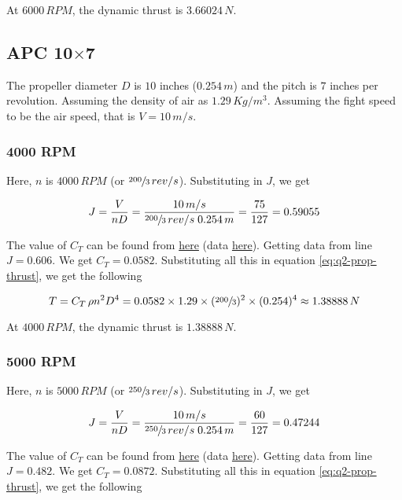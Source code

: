 At $6000\,RPM$, the dynamic thrust is $3.66024\,N$.

\subsection{APC 10\texorpdfstring{$\times$}{by}7}

The propeller diameter $D$ is $10$ inches ($0.254\,m$) and the pitch is $7$ inches per revolution. Assuming the density of air as $1.29\,Kg/m^3$.
Assuming the fight speed to be the air speed, that is $V = 10\,m/s$.

\subsubsection*{4000 RPM}

Here, $n$ is $4000\,RPM$ (or $\sfrac{200}{3}\,rev/s$). Substituting in $J$, we get

\begin{equation*}
    J = \frac{V}{nD} = \frac{10\,m/s}{\sfrac{200}{3}\,rev/s \; 0.254\,m} = \frac{75}{127} = 0.59055
\end{equation*}

The value of $C_T$ can be found from \href{https://m-selig.ae.illinois.edu/props/volume-1/plots/apcsf_10x7_ct.png}{here} (data \href{https://m-selig.ae.illinois.edu/props/volume-1/data/apcsf_10x7_kt0830_3999.txt}{here}). Getting data from line $J = 0.606$. We get $C_T = 0.0582$. Substituting all this in equation \ref{eq:q2-prop-thrust}, we get the following

\begin{equation*}
    T = C_T \, \rho n^2 D^4 = 0.0582 \times 1.29 \times (\sfrac{200}{3})^2 \times (0.254)^4 \approx 1.38888\,N
\end{equation*}

At $4000\,RPM$, the dynamic thrust is $1.38888\,N$.

\subsubsection*{5000 RPM}

Here, $n$ is $5000\,RPM$ (or $\sfrac{250}{3}\,rev/s$). Substituting in $J$, we get

\begin{equation*}
    J = \frac{V}{nD} = \frac{10\,m/s}{\sfrac{250}{3}\,rev/s \; 0.254\,m} = \frac{60}{127} = 0.47244
\end{equation*}

The value of $C_T$ can be found from \href{https://m-selig.ae.illinois.edu/props/volume-1/plots/apcsf_10x7_ct.png}{here} (data \href{https://m-selig.ae.illinois.edu/props/volume-1/data/apcsf_10x7_kt0831_5003.txt}{here}). Getting data from line $J = 0.482$. We get $C_T = 0.0872$. Substituting all this in equation \ref{eq:q2-prop-thrust}, we get the following

